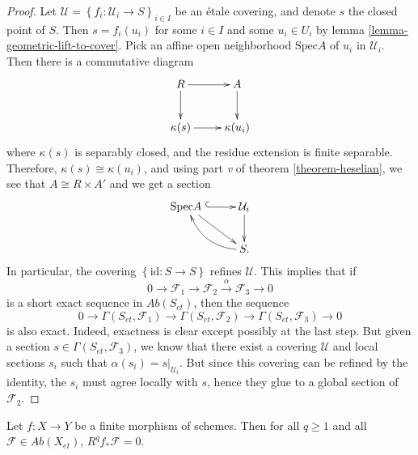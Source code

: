 \begin{proof}
Let $\mathcal{U} = \left\{f_i : \mathcal{U}_i \to S \right\}_{i\in I}$ be an
\'etale covering, and denote $s$ the closed point of $S$. Then $s = f_i (u_i)$
for some $i\in I$ and some $u_i \in U_i$ by lemma
\ref{lemma-geometric-lift-to-cover}. Pick an affine open neighborhood
$\text{Spec} A$ of $u_i$ in $\mathcal{U}_i$. Then there is a commutative diagram
$$
\xymatrix{
R \ar[r] \ar[d] & A \ar[d] \\
{\kappa(s)} \ar[r] & {\kappa(u_i)}
}
$$
where $\kappa(s)$ is separably closed, and the residue extension is finite
separable. Therefore, $\kappa(s) \cong \kappa(u_i)$, and using part {\it v} of
theorem \ref{theorem-heselian}, we see that $A \cong R\times A'$ and we get a
section
$$
\xymatrix{
{\text{Spec} A\ }\ar[dr] \ar@{^{(}->}[r] & {\mathcal{U}_i} \ar[d]\\
& {S.} \ar@/^1pc/[ul]
}
$$
In particular, the covering $\left\{\text{id} : S\to S\right\}$ refines
$\mathcal{U}$. This implies that if
$$
0 \to \mathcal{F}_1\to \mathcal{F}_2 \xrightarrow{\alpha} \mathcal{F}_3\to 0
$$
is a short exact sequence in $\textit{Ab}(S_{et})$, then the sequence
$$
0 \to \Gamma(S_{et}, \mathcal{F}_1) \to \Gamma(S_{et}, \mathcal{F}_2) \to
\Gamma(S_{et}, \mathcal{F}_3)\to 0
$$
is also exact. Indeed, exactness is clear except possibly at the last step. But
given a section $s \in \Gamma(S_{et}, \mathcal{F}_3)$, we know that there exist
a covering $\mathcal{U}$ and local sections $s_i$ such that $\alpha (s_i) =
s|_{\mathcal{U}_i}$. But since this covering can be refined by the identity,
the $s_i$ must agree locally with $s$, hence they glue to a global section of
$\mathcal{F}_2$.
\end{proof}

\begin{proposition}
\label{proposition-finite-higher-direct-image-zero}
Let $f: X\to Y$ be a finite morphism of schemes. Then for all $q\geq 1$ and all
$\mathcal{F}\in \textit{Ab}(X_{et})$, $R^q f_*\mathcal{F}=0$.
\end{proposition}

